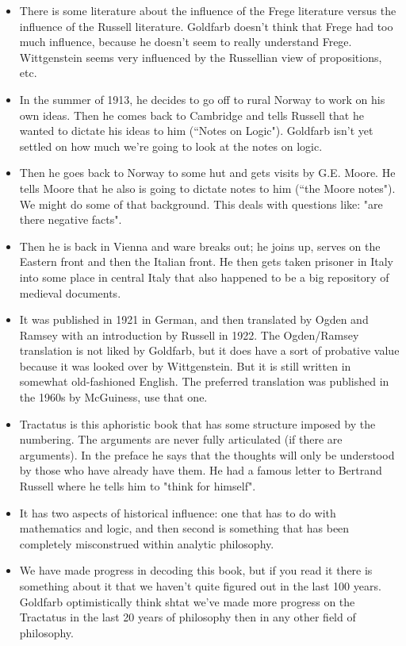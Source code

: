 \documentclass[12pt]{article}
\theoremstyle{definition}
\begin{document}
\begin{itemize}
    \item There is some literature about the influence of the Frege literature versus the influence of the Russell literature. Goldfarb doesn't think that Frege had too much influence, because he doesn't seem to really understand Frege. Wittgenstein seems very influenced by the Russellian view of propositions, etc.
    \item In the summer of 1913, he decides to go off to rural Norway to work on his own ideas. Then he comes back to Cambridge and tells Russell that he wanted to dictate his ideas to him (``Notes on Logic"). Goldfarb isn't yet settled on how much we're going to look at the notes on logic.
    \item Then he goes back to Norway to some hut and gets visits by G.E. Moore. He tells Moore that he also is going to dictate notes to him (``the Moore notes"). We might do some of that background. This deals with questions like: "are there negative facts".
    \item Then he is back in Vienna and ware breaks out; he joins up, serves on the Eastern front and then the Italian front. He then gets taken prisoner in Italy into some place in central Italy that also happened to be a big repository of medieval documents.
    \item It was published in 1921 in German, and then translated by Ogden and Ramsey with an introduction by Russell in 1922. The Ogden/Ramsey translation is not liked by Goldfarb, but it does have a sort of probative value because it was looked over by Wittgenstein. But it is still written in somewhat old-fashioned English. The preferred translation was published in the 1960s by McGuiness, use that one.
    \item Tractatus is this aphoristic book that has some structure imposed by the numbering. The arguments are never fully articulated (if there are arguments). In the preface he says that the thoughts will only be understood by those who have already have them. He had a famous letter to Bertrand Russell where he tells him to "think for himself".
    \item It has two aspects of historical influence: one that has to do with mathematics and logic, and then second is something that has been completely misconstrued within analytic philosophy.
    \item We have made progress in decoding this book, but if you read it there is something about it that we haven't quite figured out in the last 100 years. Goldfarb optimistically think shtat we've made more progress on the Tractatus in the last 20 years of philosophy then in any other field of philosophy.

\end{itemize}
\end{document}
